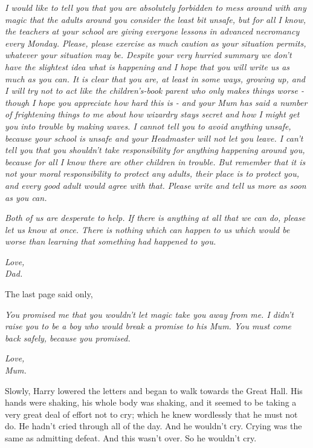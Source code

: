 \emph{I would like to tell you that you are absolutely forbidden to mess
around with any magic that the adults around you consider the least bit
unsafe, but for all I know, the teachers at your school are giving
everyone lessons in advanced necromancy every Monday. Please, please
exercise as much caution as your situation permits, whatever your
situation may be. Despite your very hurried summary we don't have the
slightest idea what is happening and I hope that you will write us as
much as you can. It is clear that you are, at least in some ways,
growing up, and I will} \emph{try} \emph{not to act like the
children's-book parent who only makes things worse - though I hope you
appreciate how hard this is - and your Mum has said a number of
frightening things to me about how wizardry stays secret and how I might
get} \emph{you} \emph{into trouble by making waves. I cannot tell you to
avoid anything unsafe, because your school is unsafe and your Headmaster
will not let you leave. I can't tell you that you shouldn't take
responsibility for anything happening around you, because for all I know
there are other children in trouble. But remember that it is} \emph{not}
\emph{your moral responsibility to protect any adults, their place is to
protect you, and every good adult would agree with that. Please write
and tell us more as soon as you can.}

\emph{Both of us are desperate to help. If there is anything at all that
we can do, please let us know at once. There is nothing which can happen
to us which would be worse than learning that something had happened to
you.}

\emph{Love,\\} \emph{Dad.} \emph{\\}

The last page said only,

\emph{You promised me that you wouldn't let magic take you away from me.
I didn't raise you to be a boy who would break a promise to his Mum. You
must come back safely, because you promised.}

\emph{Love,\\} \emph{Mum.} \emph{\\}

Slowly, Harry lowered the letters and began to walk towards the Great
Hall. His hands were shaking, his whole body was shaking, and it seemed
to be taking a very great deal of effort not to cry; which he knew
wordlessly that he must not do. He hadn't cried through all of the day.
And he wouldn't cry. Crying was the same as admitting defeat. And this
wasn't over. So he wouldn't cry.

